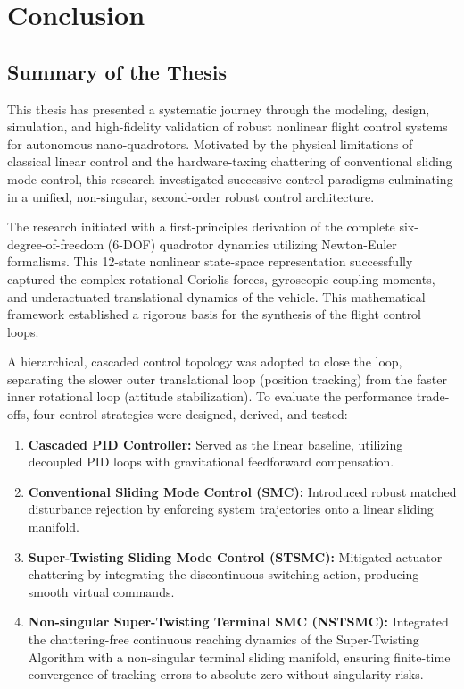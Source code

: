 \chapter{Conclusion}
\label{ch:conclusion}

\section{Summary of the Thesis}
This thesis has presented a systematic journey through the modeling, design, simulation, and high-fidelity validation of robust nonlinear flight control systems for autonomous nano-quadrotors. Motivated by the physical limitations of classical linear control and the hardware-taxing chattering of conventional sliding mode control, this research investigated successive control paradigms culminating in a unified, non-singular, second-order robust control architecture.

The research initiated with a first-principles derivation of the complete six-degree-of-freedom (6-DOF) quadrotor dynamics utilizing Newton-Euler formalisms. This 12-state nonlinear state-space representation successfully captured the complex rotational Coriolis forces, gyroscopic coupling moments, and underactuated translational dynamics of the vehicle. This mathematical framework established a rigorous basis for the synthesis of the flight control loops.

A hierarchical, cascaded control topology was adopted to close the loop, separating the slower outer translational loop (position tracking) from the faster inner rotational loop (attitude stabilization). To evaluate the performance trade-offs, four control strategies were designed, derived, and tested:
\begin{enumerate}
    \item \textbf{Cascaded PID Controller:} Served as the linear baseline, utilizing decoupled PID loops with gravitational feedforward compensation.
    \item \textbf{Conventional Sliding Mode Control (SMC):} Introduced robust matched disturbance rejection by enforcing system trajectories onto a linear sliding manifold.
    \item \textbf{Super-Twisting Sliding Mode Control (STSMC):} Mitigated actuator chattering by integrating the discontinuous switching action, producing smooth virtual commands.
    \item \textbf{Non-singular Super-Twisting Terminal SMC (NSTSMC):} Integrated the chattering-free continuous reaching dynamics of the Super-Twisting Algorithm with a non-singular terminal sliding manifold, ensuring finite-time convergence of tracking errors to absolute zero without singularity risks.
\end{enumerate}

